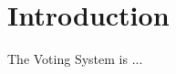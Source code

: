 \hypertarget{index_intro_sec}{}\section{Introduction}\label{index_intro_sec}
The Voting System is ... 